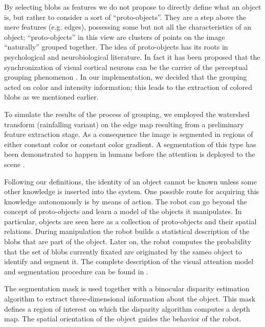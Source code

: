 By selecting blobs as features we do not propose to directly define what an object is, but rather to consider a sort of ``proto-objects''. They are a step above the mere features (e.g. edges), possessing some but not all the characteristics of an object; ``proto-objects'' in this view are clusters of points on the image ``naturally'' grouped together. The idea of proto-objects has its roots in psychological \cite{pylyshyn01indexes} and neurobiological literature. In fact it has been proposed that the synchronization of visual cortical neurons can be the carrier of the perceptual grouping phenomenon \cite{eckhorn88coherent,gray89oscillatory}.
In our implementation, we decided that the grouping acted on color and intensity information; this leads to the extraction of colored blobs as we mentioned earlier. 

To simulate the results of the process of grouping, we employed the watershed transform (rainfalling variant) \cite{smet00rainfalling} on the edge map resulting from a preliminary feature extraction stage. As a consequence the image is segmented in regions of either constant color or constant color gradient. A segmentation of this type has been demonstrated to happen in humans before the attention is deployed to the scene \cite{driver00segmentation}.

Following our definitions, the identity of an object cannot be known unless some other knowledge is inserted into the system. One possible route for acquiring this knowledge autonomously is by means of action. The robot can go beyond the concept of proto-objects and learn a model of the objects it manipulates. In particular, objects are seen here as a collection of proto-objects and their spatial relations. During manipulation the robot builds a statistical description of the blobs that are part of the object. Later on, the robot computes the probability that the set of blobs currently fixated are originated by the sameo object to identify and segment it. The complete description of the visual attention model and segmentation procedure can be found in \cite{orabona05object}.

The segmentation mask is used together with a binocular disparity estimation algorithm to extract three-dimensional information about the object.
This mask defines a region of interest on which the disparity algorithm computes a depth map. The spatial orientation of the object guides the behavior of the robot.


